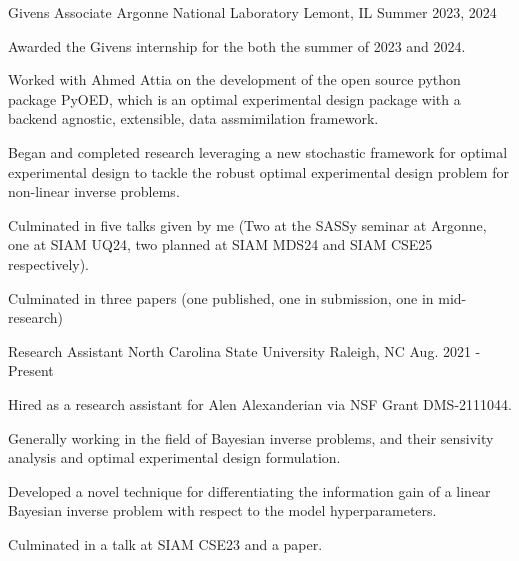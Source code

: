 


\begin{cventries}

  \cventry
    {Givens Associate} %
    {Argonne National Laboratory} %
    {Lemont, IL} %
    {Summer 2023, 2024} %
    {
      \begin{cvitems} %
        \item {Awarded the Givens internship for the both the summer of 2023 and 2024.}
        \item {Worked with Ahmed Attia on the development of the open source python
        package PyOED, which is an optimal experimental design package with a backend
        agnostic, extensible, data assmimilation framework.}
        \item {Began and completed research leveraging a new stochastic framework for
        optimal experimental design to tackle the robust optimal experimental design
        problem for non-linear inverse problems.}
        \item {Culminated in five talks given by me (Two at the SASSy seminar at
        Argonne, one at SIAM UQ24, two planned at SIAM MDS24 and SIAM CSE25 respectively).}
        \item {Culminated in three papers (one published, one in submission, one in
        mid-research)}
      \end{cvitems}
    }

  \cventry
    {Research Assistant} %
    {North Carolina State University} %
    {Raleigh, NC} %
    {Aug. 2021 - Present} %
    {
      \begin{cvitems} %
        \item {Hired as a research assistant for Alen Alexanderian via NSF Grant DMS-2111044.}
        \item {Generally working in the field of Bayesian inverse problems, and their sensivity analysis and optimal experimental design formulation.}
        \item {Developed a novel technique for differentiating the information gain of a linear Bayesian inverse problem with respect to the model hyperparameters.}
        \item {Culminated in a talk at SIAM CSE23 and a paper.}
      \end{cvitems}
    }


\end{cventries}

